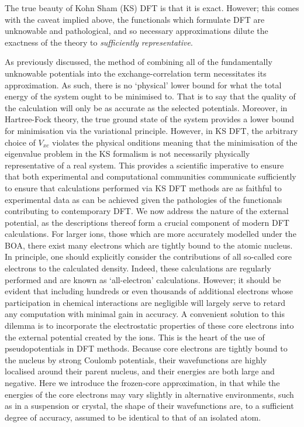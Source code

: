 The true beauty of Kohn Sham (KS) DFT is that it is exact. However; this comes with the caveat implied above, the functionals which formulate DFT are unknowable and pathological, and so necessary approximations dilute the exactness of the theory to \textit{sufficiently representative}.

As previously discussed, the method of combining all of the fundamentally unknowable potentials into the exchange-correlation term necessitates its approximation. As such, there is no `physical' lower bound for what the total energy of the system ought to be minimised to. That is to say that the quality of the calculation will only be as accurate as the selected potentials. Moreover, in Hartree-Fock theory, the true ground state of the system provides a lower bound for minimisation via the variational principle. However, in KS DFT, the arbitrary choice of $V_{xc}$ violates the physical onditions meaning that the minimisation of the eigenvalue problem in the KS formalism is not necessarily physically representative of a real system. This provides a scientific imperative to ensure that both experimental and computational communities communicate sufficiently to ensure that calculations performed via KS DFT methods are as faithful to experimental data as can be achieved given the pathologies of the functionals contributing to contemporary DFT.
We now address the nature of the external potential, as the descriptions thereof form a crucial component of modern DFT calculations. For larger ions, those which are more accurately modelled under the BOA, there exist many electrons which are tightly bound to the atomic nucleus. In principle, one should explicitly consider the contributions of all so-called core electrons to the calculated density. Indeed, these calculations are regularly performed and are known as `all-electron' calculations. However; it should be evident that including hundreds or even thousands of additional electrons whose participation in chemical interactions are negligible will largely serve to retard any computation with minimal gain in accuracy. A convenient solution to this dilemma is to incorporate the electrostatic properties of these core electrons into the external potential created by the ions. This is the heart of the use of pseudopotentials in DFT methods. Because core electrons are tightly bound to the nucleus by strong Coulomb potentials, their wavefunctions are highly localised around their parent nucleus, and their energies are both large and negative. Here we introduce the frozen-core approximation, in that while the energies of the core electrons may vary slightly in alternative environments, such as in a suspension or crystal, the shape of their wavefunctions are, to a sufficient degree of accuracy, assumed to be identical to that of an isolated atom. 

